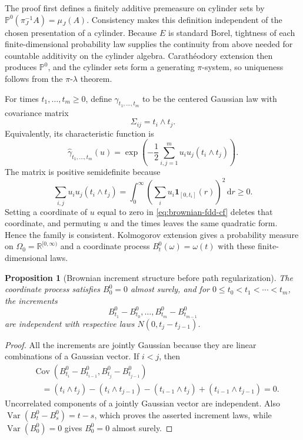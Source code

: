 \documentclass[10pt,a4paper]{article}
\numberwithin{equation}{section}
\theoremstyle{blueplain}
\newtheorem{proposition}[theorem]{Proposition}
\theoremstyle{definition}
\newcommand{\Pp}{\mathbb P}
\newcommand{\R}{\mathbb R}
\newcommand{\dd}{\,\mathrm d}
\newcommand{\ind}{\mathbf 1}
\newcommand{\Var}{\operatorname{Var}}
\newcommand{\Cov}{\operatorname{Cov}}
\begin{document}
The proof first defines a finitely additive premeasure on cylinder sets by
\(\Pp^0(\pi_J^{-1}A)=\mu_J(A)\).  Consistency makes this definition independent
of the chosen presentation of a cylinder.  Because \(E\) is standard Borel,
tightness of each finite-dimensional probability law supplies the continuity
from above needed for countable additivity on the cylinder algebra.
Carath\'eodory extension then produces \(\Pp^0\), and the cylinder sets form a
generating \(\pi\)-system, so uniqueness follows from the \(\pi\)-\(\lambda\)
theorem.

For times \(t_1,\ldots,t_m\ge0\), define \(\gamma_{t_1,\ldots,t_m}\) to be the
centered Gaussian law with covariance matrix
\begin{equation}
  \Sigma_{ij}=t_i\wedge t_j.
  \label{eq:brownian-covariance}
\end{equation}
Equivalently, its characteristic function is
\begin{equation}
  \widehat\gamma_{t_1,\ldots,t_m}(u)
  =\exp\!\left(
    -\frac12\sum_{i,j=1}^m u_i u_j(t_i\wedge t_j)
  \right).
  \label{eq:brownian-fdd-cf}
\end{equation}
The matrix is positive semidefinite because
\[
  \sum_{i,j}u_i u_j(t_i\wedge t_j)
  =\int_0^\infty
    \left(\sum_i u_i\ind_{[0,t_i]}(r)\right)^2\dd r\ge0.
\]
Setting a coordinate of \(u\) equal to zero in
\eqref{eq:brownian-fdd-cf} deletes that coordinate, and permuting \(u\) and
the times leaves the same quadratic form.  Hence the family is consistent.
Kolmogorov extension gives a probability measure on
\(\Omega_0=\R^{[0,\infty)}\) and a coordinate process
\(B_t^0(\omega)=\omega(t)\) with these finite-dimensional laws.

\begin{proposition}[Brownian increment structure before path regularization]
The coordinate process satisfies \(B_0^0=0\) almost surely, and for
\(0\le t_0<t_1<\cdots<t_m\), the increments
\[
  B_{t_1}^0-B_{t_0}^0,\ldots,B_{t_m}^0-B_{t_{m-1}}^0
\]
are independent with respective laws \(N(0,t_j-t_{j-1})\).
\end{proposition}

\begin{proof}
All the increments are jointly Gaussian because they are linear combinations
of a Gaussian vector.  If \(i<j\), then
\begin{align*}
 &\Cov(B_{t_i}^0-B_{t_{i-1}}^0,
       B_{t_j}^0-B_{t_{j-1}}^0)\\
 &\quad=(t_i\wedge t_j)-(t_i\wedge t_{j-1})
       -(t_{i-1}\wedge t_j)+(t_{i-1}\wedge t_{j-1})=0.
\end{align*}
Uncorrelated components of a jointly Gaussian vector are independent.  Also
\(\Var(B_t^0-B_s^0)=t-s\), which proves the asserted increment laws, while
\(\Var(B_0^0)=0\) gives \(B_0^0=0\) almost surely.
\end{proof}
\end{document}
